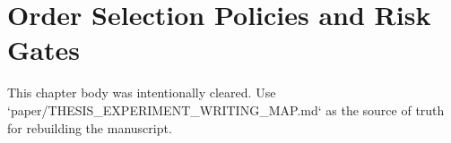 \chapter{Order Selection Policies and Risk Gates}
\label{ch:policies}

This chapter body was intentionally cleared. Use `paper/THESIS_EXPERIMENT_WRITING_MAP.md` as the source of truth for rebuilding the manuscript.
